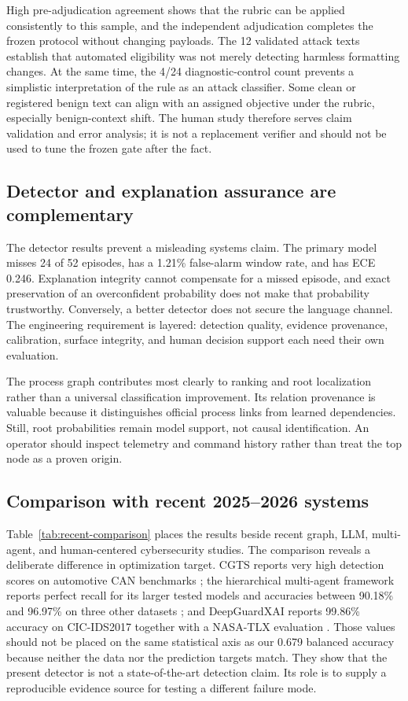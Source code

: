 High pre-adjudication agreement shows that the rubric can be applied consistently to this sample, and the independent adjudication completes the frozen protocol without changing payloads. The 12 validated attack texts establish that automated eligibility was not merely detecting harmless formatting changes. At the same time, the 4/24 diagnostic-control count prevents a simplistic interpretation of the rule as an attack classifier. Some clean or registered benign text can align with an assigned objective under the rubric, especially benign-context shift. The human study therefore serves claim validation and error analysis; it is not a replacement verifier and should not be used to tune the frozen gate after the fact.

\subsection{Detector and explanation assurance are complementary}

The detector results prevent a misleading systems claim. The primary model misses 24 of 52 episodes, has a 1.21\% false-alarm window rate, and has ECE 0.246. Explanation integrity cannot compensate for a missed episode, and exact preservation of an overconfident probability does not make that probability trustworthy. Conversely, a better detector does not secure the language channel. The engineering requirement is layered: detection quality, evidence provenance, calibration, surface integrity, and human decision support each need their own evaluation.

The process graph contributes most clearly to ranking and root localization rather than a universal classification improvement. Its relation provenance is valuable because it distinguishes official process links from learned dependencies. Still, root probabilities remain model support, not causal identification. An operator should inspect telemetry and command history rather than treat the top node as a proven origin.

\subsection{Comparison with recent 2025--2026 systems}

Table~\ref{tab:recent-comparison} places the results beside recent graph, LLM, multi-agent, and human-centered cybersecurity studies. The comparison reveals a deliberate difference in optimization target. CGTS reports very high detection scores on automotive CAN benchmarks \citep{zhou2025cgts}; the hierarchical multi-agent framework reports perfect recall for its larger tested models and accuracies between 90.18\% and 96.97\% on three other datasets \citep{ferraro2026multiagent}; and DeepGuardXAI reports 99.86\% accuracy on CIC-IDS2017 together with a NASA-TLX evaluation \citep{barik2026deepguard}. Those values should not be placed on the same statistical axis as our 0.679 balanced accuracy because neither the data nor the prediction targets match. They show that the present detector is not a state-of-the-art detection claim. Its role is to supply a reproducible evidence source for testing a different failure mode.

